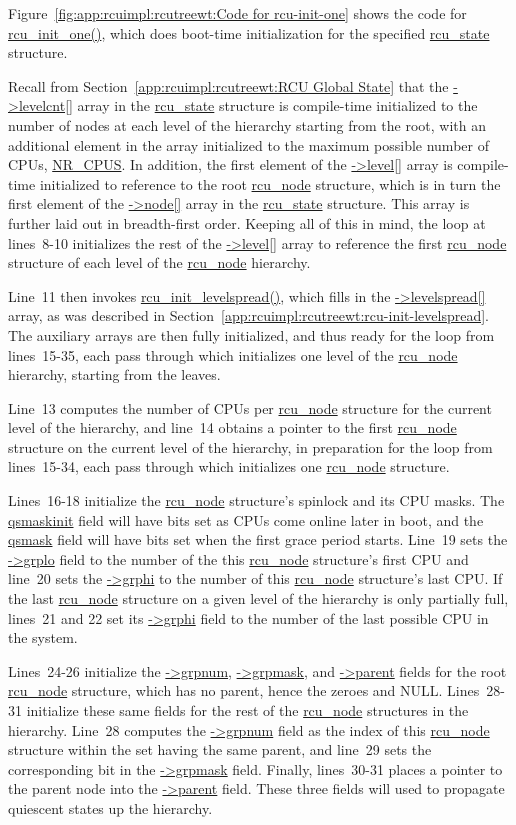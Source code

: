 Figure~\ref{fig:app:rcuimpl:rcutreewt:Code for rcu-init-one}
shows the code for \url{rcu_init_one()}, which does boot-time initialization
for the specified 
\url{rcu_state} structure.

Recall from
Section~\ref{app:rcuimpl:rcutreewt:RCU Global State}
that the \url{->levelcnt[]} array in the \url{rcu_state} structure
is compile-time initialized to the number of nodes at each level of
the hierarchy starting from the root,
with an additional element in the array initialized
to the maximum possible number of CPUs, \url{NR_CPUS}.
In addition, the first element of the \url{->level[]} array is compile-time
initialized to reference to the root \url{rcu_node} structure, which is
in turn
the first element of the \url{->node[]} array in the \url{rcu_state} structure.
This array is further laid out in breadth-first order.
Keeping all of this in mind, the loop at lines~8-10 initializes the rest
of the \url{->level[]} array to reference the first \url{rcu_node} structure
of each level of the \url{rcu_node} hierarchy.

Line~11 then invokes \url{rcu_init_levelspread()}, which fills in the
\url{->levelspread[]} array, as was described in
Section~\ref{app:rcuimpl:rcutreewt:rcu-init-levelspread}.
The auxiliary arrays are then fully initialized, and thus ready for
the loop from lines~15-35, each pass through which initializes
one level of the \url{rcu_node} hierarchy, starting from the leaves.

Line~13 computes the number of CPUs per \url{rcu_node} structure for
the current level of the hierarchy, and line~14 obtains a pointer
to the first \url{rcu_node} structure on the current level of the
hierarchy, in preparation for the loop from lines~15-34, each pass
through which initializes one \url{rcu_node} structure.

Lines~16-18 initialize the \url{rcu_node} structure's spinlock and
its CPU masks.
The \url{qsmaskinit} field will have bits set as CPUs come online
later in boot, and the \url{qsmask} field will have bits set
when the first grace period starts.
Line~19 sets the \url{->grplo} field to the number of the this
\url{rcu_node} structure's first CPU and line~20 sets the
\url{->grphi} to the number of this \url{rcu_node} structure's
last CPU.
If the last \url{rcu_node} structure on a given level of the
hierarchy is only partially full, lines~21 and 22 set its
\url{->grphi} field to the number of the last possible CPU in the system.

Lines~24-26 initialize the \url{->grpnum}, \url{->grpmask}, and
\url{->parent} fields for the root \url{rcu_node} structure, which
has no parent, hence the zeroes and NULL.
Lines~28-31 initialize these same fields for the rest of the
\url{rcu_node} structures in the hierarchy.
Line~28 computes the \url{->grpnum} field as the index of this
\url{rcu_node} structure within
the set having the same parent, and 
line~29 sets the corresponding bit in the \url{->grpmask} field.
Finally, lines~30-31 places a pointer to the parent node into the
\url{->parent} field.
These three fields will used to propagate quiescent states up the
hierarchy.

